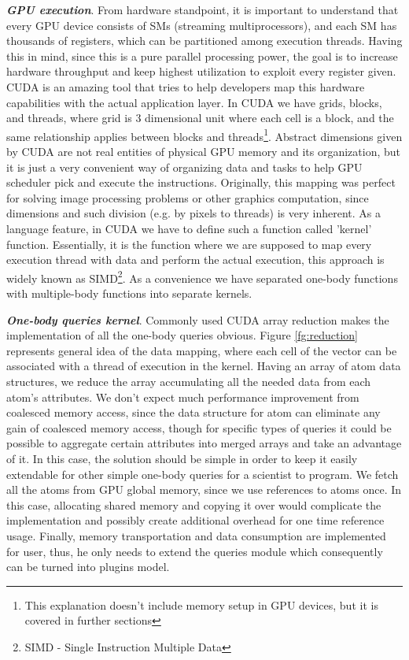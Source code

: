 \documentclass[11pt,a4paper]{report}
\begin{document}
\emph{\textbf{GPU execution}}. From hardware standpoint, it is important to understand that every GPU device consists of SMs (streaming multiprocessors), and each SM has thousands of registers, which can be partitioned among execution threads. Having this in mind, since this is a pure parallel processing power, the goal is to increase hardware throughput and keep highest utilization to exploit every register given. CUDA is an amazing tool that tries to help developers map this hardware capabilities with the actual application layer. In CUDA we have grids, blocks, and threads, where grid is 3 dimensional unit where each cell is a block, and the same relationship applies between blocks and threads\footnote{This explanation doesn't include memory setup in GPU devices, but it is covered in further sections}. Abstract dimensions given by CUDA are not real entities of physical GPU memory and its organization, but it is just a very convenient way of organizing data and tasks to help GPU scheduler pick and execute the instructions. Originally, this mapping was perfect for solving image processing problems or other graphics computation, since dimensions and such division (e.g. by pixels to threads) is very inherent. As a language feature, in CUDA we have to define such a function called 'kernel' function. Essentially, it is the function where we are supposed to map every execution thread with data and perform the actual execution, this approach is widely known as SIMD\footnote{SIMD - Single Instruction Multiple Data}. As a convenience we have separated one-body functions with multiple-body functions into separate kernels.

\emph{\textbf{One-body queries kernel}}.
Commonly used CUDA array reduction\cite{gpureduction} makes the implementation of all the one-body queries obvious. Figure \ref{fg:reduction} represents general idea of the data mapping, where each cell of the vector can be associated with a thread of execution in the kernel. Having an array of atom data structures, we reduce the array accumulating all the needed data from each atom's attributes. We don't expect much performance improvement from coalesced memory access, since the data structure for atom can eliminate any gain of coalesced memory access, though for specific types of queries it could be possible to aggregate certain attributes into merged arrays and take an advantage of it. In this case, the solution should be simple in order to keep it easily extendable for other simple one-body queries for a scientist to program. We fetch all the atoms from GPU global memory, since we use references to atoms once. In this case, allocating shared memory and copying it over would complicate the implementation and possibly create additional overhead for one time reference usage. Finally, memory transportation and data consumption are implemented for user, thus, he only needs to extend the queries module which consequently can be turned into plugins model.
\end{document}
